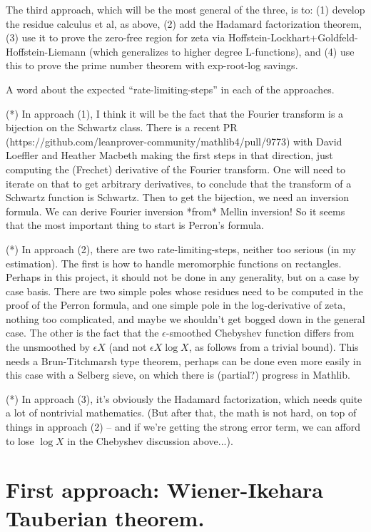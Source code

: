 The third approach, which will be the most general of the three, is to: (1) develop the residue calculus et al, as above, (2) add the Hadamard factorization theorem, (3) use it to prove the zero-free region for zeta via Hoffstein-Lockhart+Goldfeld-Hoffstein-Liemann (which generalizes to higher degree L-functions), and (4) use this to prove the prime number theorem with exp-root-log savings.

A word about the expected ``rate-limiting-steps'' in each of the approaches.

(*) In approach (1), I think it will be the fact that the Fourier transform is a bijection on the Schwartz class. There is a recent PR (https://github.com/leanprover-community/mathlib4/pull/9773) with David Loeffler and Heather Macbeth making the first steps in that direction, just computing the (Frechet) derivative of the Fourier transform. One will need to iterate on that to get arbitrary derivatives, to conclude that the transform of a Schwartz function is Schwartz. Then to get the bijection, we need an inversion formula. We can derive Fourier inversion *from* Mellin inversion! So it seems that the most important thing to start is Perron's formula.

(*) In approach (2), there are two rate-limiting-steps, neither too serious (in my estimation). The first is how to handle meromorphic functions on rectangles. Perhaps in this project, it should not be done in any generality, but on a case by case basis. There are two simple poles whose residues need to be computed in the proof of the Perron formula, and one simple pole in the log-derivative of zeta, nothing too complicated, and maybe we shouldn't get bogged down in the general case. The other is the fact that the $\epsilon$-smoothed Chebyshev function differs from the unsmoothed by $\epsilon X$ (and not $\epsilon X \log X$, as follows from a trivial bound). This needs a Brun-Titchmarsh type theorem, perhaps can be done even more easily in this case with a Selberg sieve, on which there is (partial?) progress in Mathlib.

(*) In approach (3), it's obviously the Hadamard factorization, which needs quite a lot of nontrivial mathematics. (But after that, the math is not hard, on top of things in approach (2) -- and if we're getting the strong error term, we can afford to lose $\log X$ in the Chebyshev discussion above...).

\chapter{First approach: Wiener-Ikehara Tauberian theorem.}

